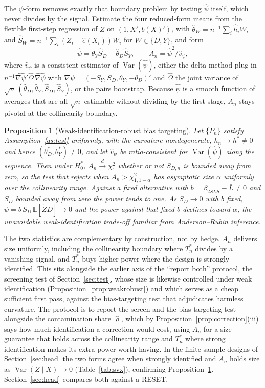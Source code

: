 \documentclass[preprint,11pt,authoryear]{elsarticle}
\newtheorem{proposition}{Proposition}
\theoremstyle{definition}
\newcommand{\E}{\mathbb{E}}
\newcommand{\Var}{\operatorname{Var}}
\newcommand{\Ztil}{\tilde{Z}}
\newcommand{\convd}{\overset{d}{\longrightarrow}}
\begin{document}
The $\psi$-form removes exactly that boundary problem by testing $\hat\psi$ itself,
which never divides by the signal. Estimate the four reduced-form means from the
flexible first-step regression of $Z$ on $(1,X',b(X)')$, with
$\hat\theta_W=n^{-1}\sum_i\hat h_i W_i$ and
$\hat S_W=n^{-1}\sum_i(Z_i-\hat e(X_i))W_i$ for $W\in\{D,Y\}$, and form
\begin{equation}\label{eq:arstat}
\hat\psi=\hat\theta_Y\hat S_D-\hat\theta_D\hat S_Y,\qquad
A_n=\hat\psi^2/\hat v_\psi,
\end{equation}
where $\hat v_\psi$ is a consistent estimator of $\Var(\hat\psi)$, either the
delta-method plug-in $n^{-1}\widehat{\nabla\psi}{}'\hat\Omega\,\widehat{\nabla\psi}$
with $\nabla\psi=(-S_Y,S_D,\theta_Y,-\theta_D)'$ and $\hat\Omega$ the joint
variance of $\sqrt n\,(\hat\theta_D,\hat\theta_Y,\hat S_D,\hat S_Y)$, or the pairs
bootstrap. Because $\hat\psi$ is a smooth function of averages that are all
$\sqrt n$-estimable without dividing by the first stage, $A_n$ stays pivotal at the
collinearity boundary.

\begin{proposition}[Weak-identification-robust bias targeting]\label{prop:arbias}
Let $\{P_n\}$ satisfy Assumption~\ref{as:test} uniformly, with the curvature
nondegenerate, $h_n\to h^\ast\neq0$ and hence $(\theta_D^\ast,\theta_Y^\ast)\neq0$,
and let $\hat v_\psi$ be ratio-consistent for $\Var(\hat\psi)$ along the sequence.
Then under $H_0^{\ast}$, $A_n\convd\chi^2_1$ whether or not $S_{D,n}$ is bounded away
from zero, so the test that rejects when $A_n>\chi^2_{1,1-\alpha}$ has asymptotic size
$\alpha$ uniformly over the collinearity range. Against a fixed alternative with
$b=\beta_{2SLS}-\bar L\neq0$ and $S_D$ bounded away from zero the power tends to one.
As $S_D\to0$ with $b$ fixed, $\psi=b\,S_D\,\E[\Ztil D]\to0$ and the power against that
fixed $b$ declines toward $\alpha$, the unavoidable weak-identification trade-off
familiar from Anderson--Rubin inference.
\end{proposition}

The two statistics are complementary by construction, not by hedge. $A_n$ delivers
size uniformly, including the collinearity boundary where $T_n^{\ast}$ divides by a
vanishing signal, and $T_n^{\ast}$ buys higher power where the design is strongly
identified. This sits alongside the earlier axis of the ``report both'' protocol, the
screening test of Section~\ref{sec:test}, whose size is likewise controlled under weak
identification (Proposition~\ref{prop:weakrobust}) and which serves as a cheap
sufficient first pass, against the bias-targeting test that adjudicates harmless
curvature. The protocol is to report the screen and the bias-targeting test alongside
the contamination share $\hat\varrho$, which by Proposition~\ref{prop:correction}(iii) says how
much identification a correction would cost, using $A_n$ for a size guarantee that
holds across the collinearity range and $T_n^{\ast}$ where strong identification makes
its extra power worth having. In the finite-sample designs of Section~\ref{sec:head}
the two forms agree when strongly identified and $A_n$ holds size as
$\Var(Z\mid X)\to0$ (Table~\ref{tab:svx}), confirming
Proposition~\ref{prop:arbias}. Section~\ref{sec:head} compares both against a RESET.
\end{document}
